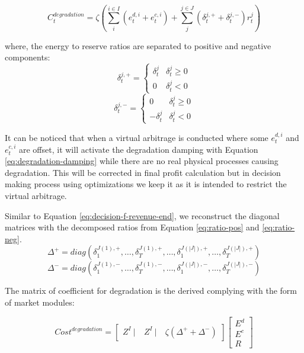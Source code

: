 \begin{equation}
\label{eq:degradation-damping}
C^{degradation}_t = \zeta (\sum_{i}^{i \in I}(e_t^{d,i}+e_t^{c,i})+\sum_{j}^{j \in J}(\delta_t^{j,+}+\delta_t^{j,-})r_t^j)
\end{equation}

where, the energy to reserve ratios are separated to positive and negative components:
\begin{equation}
\label{eq:ratio-pos}
\delta_t^{j,+} = \begin{cases}
\delta_t^j & \delta_t^j  \geq 0\\
0 & \delta_t^j  < 0
\end{cases}
\end{equation}
\begin{equation}
\label{eq:ratio-neg}
\delta_t^{j,-} = \begin{cases}
0 & \delta_t^j  \geq 0\\
-\delta_t^j & \delta_t^j  < 0
\end{cases}
\end{equation}

It can be noticed that when a virtual arbitrage is conducted where some $e_t^{d,i}$ and $e_t^{c,i}$ are offset, it will activate the degradation damping with Equation \eqref{eq:degradation-damping} while there are no real physical processes causing degradation. This will be corrected in final profit calculation but in decision making process using optimizations we keep it as it is intended to restrict the virtual arbitrage.

Similar to Equation \eqref{eq:decision-f-revenue-end}, we reconstruct the diagonal matrices with the decomposed ratios from Equation \eqref{eq:ratio-pos} and \eqref{eq:ratio-neg}.
\begin{equation}
\Delta^+ = diag (
\delta_1^{J(1),+}, \dots , \delta_T^{J(1),+}, \dots, \delta_1^{J(|J|),+}, \dots, \delta_T^{J(|J|),+})
\end{equation}
\begin{equation}
\Delta^- = diag (
\delta_1^{J(1),-}, \dots , \delta_T^{J(1),-}, \dots, \delta_1^{J(|J|),-}, \dots, \delta_T^{J(|J|),-})
\end{equation}

The matrix of coefficient for degradation is the derived complying with the form of market modules:

\begin{equation*}
Cost^{degradation} = \begin{bmatrix}
Z^{I}~|~&Z^{I}~|~& \zeta (\Delta^{+} +\Delta^{-})
\end{bmatrix} \begin{bmatrix}
E^d \\ E^c \\ R
\end{bmatrix}
\end{equation*}

